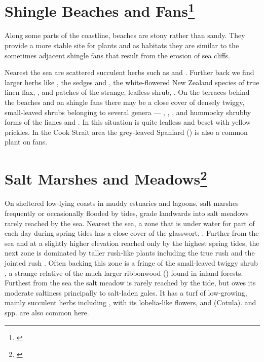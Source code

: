 \section[Shingle Beaches and Fans]{Shingle Beaches and Fans\footnote{\cite{moore1963plants}}}

Along some parts of the coastline, beaches are stony rather than sandy.
They provide a more stable site for plants and as habitats they are similar to the sometimes adjacent shingle fans that result from the erosion of sea cliffs.

Nearest the sea are scattered succulent herbs such as  and .
Further back we find larger herbs like , the sedges  and , the white-flowered New Zealand species of true linen flax, , and patches of the strange, leafless shrub, .
On the terraces behind the beaches and on shingle fans there may be a close cover of densely twiggy, small-leaved shrubs belonging to several genera — , ,  ,   and hummocky shrubby forms of the lianes  and .
In this situation  is quite leafless and beset with yellow prickles.
In the Cook Strait area the grey-leaved Spaniard () is also a common plant on fans.

\section[Salt Marshes and Meadows]{Salt Marshes and Meadows\footnote{\cite{moore1963plants}}}

On sheltered low-lying coasts in muddy estuaries and lagoons, salt marshes frequently or occasionally flooded by tides, grade landwards into salt meadows rarely reached by the sea.
Nearest the sea, a zone that is under water for part of each day during spring tides has a close cover of the glasswort, .
Further from the sea and at a slightly higher elevation reached only by the highest spring tides, the next zone is dominated by taller rush-like plants including the true rush  and the jointed rush .
Often backing this zone is a fringe of the small-leaved twiggy shrub , a strange relative of the much larger ribbonwood () found in inland forests.
Furthest from the sea the salt meadow is rarely reached by the tide, but owes its moderate saltiness principally to salt-laden gales.
It has a turf of low-growing, mainly succulent herbs including ,  with its lobelia-like flowers,  and  (Cotula).  and  spp. are also common here.

